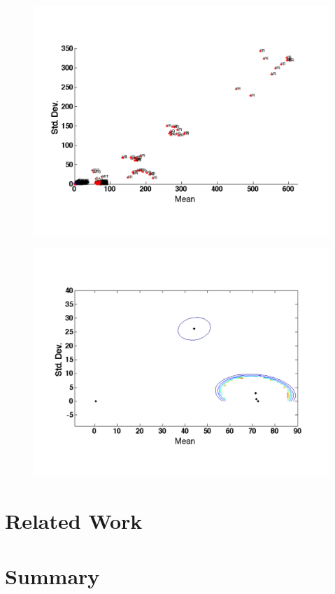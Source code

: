 \begin{figure}[t!] %
\centering
\includegraphics[width=1.0\columnwidth]{figs/VR}
\caption{}
\label{fig:tstreams}
\end{figure}

\begin{figure}[t!] %
\centering
\includegraphics[width=1.0\columnwidth]{figs/gmm_centers}
\caption{}
\label{fig:tstreams}
\end{figure}


\section{Related Work}




\section{Summary}






